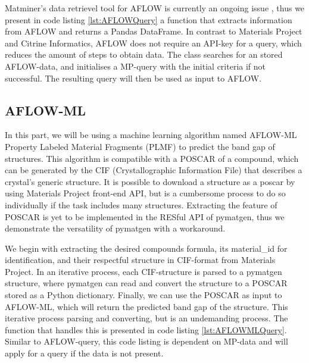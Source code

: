 Matminer's data retrievel tool for AFLOW is currently an ongoing issue \cite{Rosenbrock2017}, thus we present in code listing \ref{lst:AFLOWQuery} a function that extracts information from AFLOW and returns a Pandas DataFrame. In contrast to Materials Project and Citrine Informatics, AFLOW does not require an API-key for a query, which reduces the amount of steps to obtain data. The class searches for an stored AFLOW-data, and initialises a MP-query with the initial criteria if not successful. The resulting query will then be used as input to AFLOW.



\subsection{AFLOW-ML}

In this part, we will be using a machine learning algorithm named AFLOW-ML Property Labeled Material Fragments (PLMF) \cite{Isayev2017} to predict the band gap of structures. This algorithm is compatible with a POSCAR of a compound, which can be generated by the CIF (Crystallographic Information File) that describes a crystal's generic structure. It is possible to download a structure as a poscar by using Materials Project front-end API, but is a cumbersome process to do so individually if the task includes many structures. Extracting the feature of POSCAR is yet to be implemented in the RESful API of pymatgen, thus we demonstrate the versatility of pymatgen with a workaround.

We begin with extracting the desired compounds formula, its material\_id for identification, and their respectful structure in CIF-format from Materials Project. In an iterative process, each CIF-structure is parsed to a pymatgen structure, where pymatgen can read and convert the structure to a POSCAR stored as a Python dictionary. Finally, we can use the POSCAR as input to AFLOW-ML, which will return the predicted band gap of the structure. This iterative process parsing and converting, but is an undemanding process. The function that handles this is presented in code listing \ref{lst:AFLOWMLQuery}. Similar to AFLOW-query, this code listing is dependent on MP-data and will apply for a query if the data is not present.

